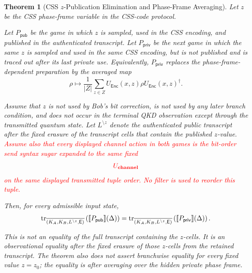 \documentclass[acmsmall,screen,review,anonymous,nonacm]{acmart}
\theoremstyle{defn_style}
\newtheorem{thm}{Theorem}[section]
\newcommand{\sem}[1]{\llbracket #1 \rrbracket}
\newcommand{\tr}{\textup{tr}}
\begin{document}
\begin{thm}[CSS \(z\)-Publication Elimination and Phase-Frame Averaging]
\label{thm:phase-frame-averaging}
Let \(z\) be the CSS phase-frame variable in the CSS-code protocol.

Let \(P_{\mathsf{pub}}\) be the game in which \(z\) is sampled, used in the
CSS encoding, and published in the authenticated transcript.  Let
\(P_{\mathsf{priv}}\) be the next game in which the same \(z\) is sampled and
used in the same CSS encoding, but is not published and is traced out after its
last private use.  Equivalently, \(P_{\mathsf{priv}}\) replaces the
phase-frame-dependent preparation by the averaged map
\[
\rho
\longmapsto
\frac1{|Z|}
\sum_{z\in Z}
U_{\mathsf{Enc}}(x,z)\rho U_{\mathsf{Enc}}(x,z)^\dagger .
\]

Assume that \(z\) is not used by Bob's bit correction, is not used by any later
branch condition, and does not occur in the terminal QKD observation except
through the transmitted quantum state.  Let \(L^{\setminus z}\) denote the
authenticated public transcript after the fixed erasure of the transcript cells
that contain the published \(z\)-value. \textcolor{red}{Assume also that every displayed channel action in both games is the bit-order send syntax sugar expanded to the same fixed}
\[
\textcolor{red}{
U_{\textbf{channel}}
}
\]
\textcolor{red}{on the same displayed transmitted tuple order. No filter is used to reorder
this tuple.}

Then, for every admissible input state,
\[
\tr_{\overline{(K_A,K_B,L^{\setminus z},\mathsf E)}}
\left(
\sem{P_{\mathsf{pub}}}(\Delta)
\right)
=
\tr_{\overline{(K_A,K_B,L^{\setminus z},\mathsf E)}}
\left(
\sem{P_{\mathsf{priv}}}(\Delta)
\right).
\]

This is not an equality of the full transcript containing the \(z\)-cells.
It is an observational equality after the fixed erasure of those \(z\)-cells
from the retained transcript.  The theorem also does not assert branchwise
equality for every fixed value \(z=z_0\); the equality is after averaging over
the hidden private phase frame.
\end{thm}
\end{document}
